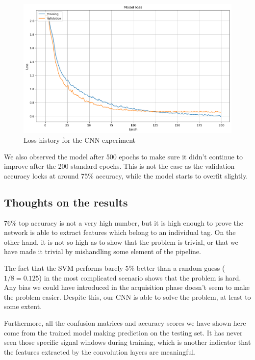 \begin{figure}[htbp!]
  \centering
  \includegraphics[scale=0.6]{figures/ml_cnn640loss.png}
  \caption{Loss history for the CNN experiment}
  \label{fig:cnn640loss}
\end{figure}

We also observed the model after 500 epochs to make sure it didn't continue to improve after the 200 standard epochs. This is not the case as the validation accuracy locks at around 75\% accuracy, while the model starts to overfit slightly.

\subsection{Thoughts on the results}

76\% top accuracy is not a very high number, but it is high enough to prove the network is able to extract features which belong to an individual tag. On the other hand, it is not so high as to show that the problem is trivial, or that we have made it trivial by mishandling some element of the pipeline.

The fact that the SVM performs barely 5\% better than a random guess ($1/8 = 0.125$) in the most complicated scenario shows that the problem is hard. Any bias we could have introduced in the acquisition phase doesn't seem to make the problem easier. Despite this, our CNN is able to solve the problem, at least to some extent.

Furthermore, all the confusion matrices and accuracy scores we have shown here come from the trained model making prediction on the testing set. It has never seen those specific signal windows during training, which is another indicator that the features extracted by the convolution layers are meaningful.

